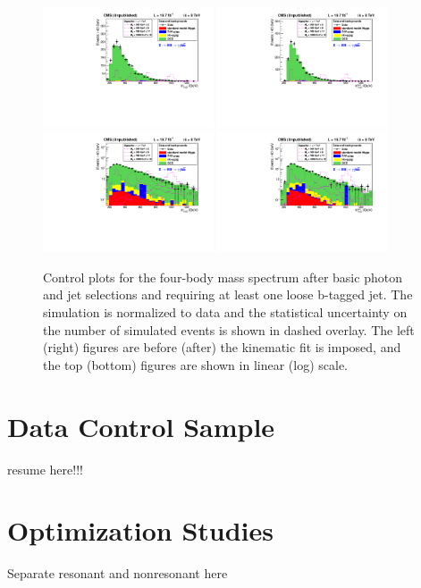 \begin{figure}[ht]
 \begin{center}
   \includegraphics[width=0.45\textwidth]{figures/selection/TotalMass_ShapeNormalized_sys.pdf}
   \includegraphics[width=0.45\textwidth]{figures/selection/TotalMassKinFit_ShapeNormalized_sys.pdf}
   \includegraphics[width=0.45\textwidth]{figures/selection/TotalMass_ShapeNormalized_Log_sys.pdf}
   \includegraphics[width=0.45\textwidth]{figures/selection/TotalMassKinFit_ShapeNormalized_Log_sys.pdf}
 \end{center}
\caption{Control plots for the four-body mass spectrum after basic photon and jet selections
and requiring at least one loose b-tagged jet. The simulation is normalized to data and
the statistical uncertainty on the number of simulated events is shown in dashed overlay.
The left (right) figures are before (after) the kinematic fit is imposed, and
the top (bottom) figures are shown in linear (log) scale.}
\label{fig:mggjj_controlplot}
\end{figure}

\section{Data Control Sample\label{sec:dataCS}}

resume here!!!

\section{Optimization Studies\label{sec:optim}}
Separate resonant and nonresonant here


